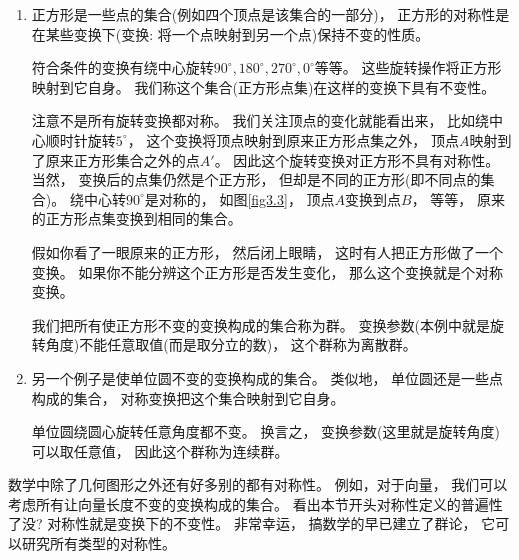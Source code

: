 \begin{enumerate}
	\item 正方形是一些点的集合(例如四个顶点是该集合的一部分)， 正方形的对称性是在某些变换下(变换: 将一个点映射到另一个点)保持不变的性质。

	符合条件的变换有绕中心旋转$90^\circ, 180^\circ, 270^\circ, 0^\circ$等等。 这些旋转操作将正方形映射到它自身。 我们称这个集合(正方形点集)在这样的变换下具有不变性。



	注意不是所有旋转变换都对称。 我们关注顶点的变化就能看出来， 比如绕中心顺时针旋转$5^\circ$， 这个变换将顶点映射到原来正方形点集之外， 顶点$A$映射到了原来正方形集合之外的点$A'$。 因此这个旋转变换对正方形不具有对称性。 当然， 变换后的点集仍然是个正方形， 但却是不同的正方形(即不同点的集合)。 绕中心转$90^\circ$是对称的， 如图\ref{fig3.3}， 顶点$A$变换到点$B$， 等等， 原来的正方形点集变换到相同的集合。

	{
	}

	假如你看了一眼原来的正方形， 然后闭上眼睛， 这时有人把正方形做了一个变换。 如果你不能分辨这个正方形是否发生变化， 那么这个变换就是个对称变换。

	我们把所有使正方形不变的变换构成的集合称为群。 变换参数(本例中就是旋转角度)不能任意取值(而是取分立的数)， 这个群称为离散群。

	\item 另一个例子是使单位圆不变的变换构成的集合。 类似地， 单位圆还是一些点构成的集合， 对称变换把这个集合映射到它自身。

	单位圆绕圆心旋转任意角度都不变。 换言之， 变换参数(这里就是旋转角度)可以取任意值， 因此这个群称为连续群。
\end{enumerate}

数学中除了几何图形之外还有好多别的都有对称性。 例如，对于向量， 我们可以考虑所有让向量长度不变的变换构成的集合。 看出本节开头对称性定义的普遍性了没? 对称性就是变换下的不变性。 非常幸运， 搞数学的早已建立了群论， 它可以研究所有类型的对称性。

